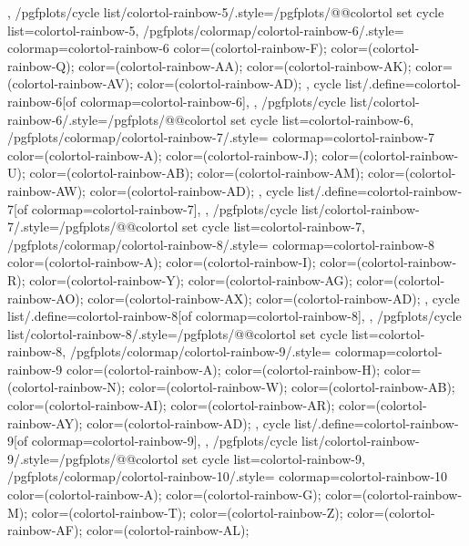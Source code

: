 {{  },
  /pgfplots/cycle list/colortol-rainbow-5/.style={/pgfplots/@@colortol set cycle list={colortol-rainbow-5}},
  /pgfplots/colormap/colortol-rainbow-6/.style={
    colormap={colortol-rainbow-6}{
      color=(colortol-rainbow-F);
      color=(colortol-rainbow-Q);
      color=(colortol-rainbow-AA);
      color=(colortol-rainbow-AK);
      color=(colortol-rainbow-AV);
      color=(colortol-rainbow-AD);
    },
    cycle list/.define={colortol-rainbow-6}{[of colormap=colortol-rainbow-6]},
  },
  /pgfplots/cycle list/colortol-rainbow-6/.style={/pgfplots/@@colortol set cycle list={colortol-rainbow-6}},
  /pgfplots/colormap/colortol-rainbow-7/.style={
    colormap={colortol-rainbow-7}{
      color=(colortol-rainbow-A);
      color=(colortol-rainbow-J);
      color=(colortol-rainbow-U);
      color=(colortol-rainbow-AB);
      color=(colortol-rainbow-AM);
      color=(colortol-rainbow-AW);
      color=(colortol-rainbow-AD);
    },
    cycle list/.define={colortol-rainbow-7}{[of colormap=colortol-rainbow-7]},
  },
  /pgfplots/cycle list/colortol-rainbow-7/.style={/pgfplots/@@colortol set cycle list={colortol-rainbow-7}},
  /pgfplots/colormap/colortol-rainbow-8/.style={
    colormap={colortol-rainbow-8}{
      color=(colortol-rainbow-A);
      color=(colortol-rainbow-I);
      color=(colortol-rainbow-R);
      color=(colortol-rainbow-Y);
      color=(colortol-rainbow-AG);
      color=(colortol-rainbow-AO);
      color=(colortol-rainbow-AX);
      color=(colortol-rainbow-AD);
    },
    cycle list/.define={colortol-rainbow-8}{[of colormap=colortol-rainbow-8]},
  },
  /pgfplots/cycle list/colortol-rainbow-8/.style={/pgfplots/@@colortol set cycle list={colortol-rainbow-8}},
  /pgfplots/colormap/colortol-rainbow-9/.style={
    colormap={colortol-rainbow-9}{
      color=(colortol-rainbow-A);
      color=(colortol-rainbow-H);
      color=(colortol-rainbow-N);
      color=(colortol-rainbow-W);
      color=(colortol-rainbow-AB);
      color=(colortol-rainbow-AI);
      color=(colortol-rainbow-AR);
      color=(colortol-rainbow-AY);
      color=(colortol-rainbow-AD);
    },
    cycle list/.define={colortol-rainbow-9}{[of colormap=colortol-rainbow-9]},
  },
  /pgfplots/cycle list/colortol-rainbow-9/.style={/pgfplots/@@colortol set cycle list={colortol-rainbow-9}},
  /pgfplots/colormap/colortol-rainbow-10/.style={
    colormap={colortol-rainbow-10}{
      color=(colortol-rainbow-A);
      color=(colortol-rainbow-G);
      color=(colortol-rainbow-M);
      color=(colortol-rainbow-T);
      color=(colortol-rainbow-Z);
      color=(colortol-rainbow-AF);
      color=(colortol-rainbow-AL);
}}}
